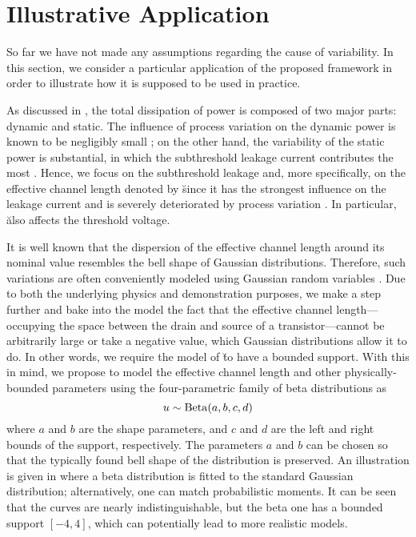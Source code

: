 \section{Illustrative Application}

So far we have not made any assumptions regarding the cause of variability. In
this section, we consider a particular application of the proposed framework in
order to illustrate how it is supposed to be used in practice.

As discussed in , the total dissipation of power is composed
of two major parts: dynamic and static. The influence of process variation on
the dynamic power is known to be negligibly small \cite{srivastava2010}; on the
other hand, the variability of the static power is substantial, in which the
subthreshold leakage current contributes the most \cite{juan2011, juan2012}.
Hence, we focus on the subthreshold leakage and, more specifically, on the
effective channel length denoted by \u since it has the strongest influence on
the leakage current and is severely deteriorated by process variation
\cite{chandrakasan2000}. In particular, \u also affects the threshold voltage.

It is well known that the dispersion of the effective channel length around its
nominal value resembles the bell shape of Gaussian distributions. Therefore,
such variations are often conveniently modeled using Gaussian random variables
\cite{bhardwaj2006, ghanta2006, huang2009a, shen2009, chandra2010,
srivastava2010, juan2011, juan2012, lee2013}. Due to both the underlying physics
and demonstration purposes, we make a step further and bake into the model the
fact that the effective channel length---occupying the space between the drain
and source of a transistor---cannot be arbitrarily large or take a negative
value, which Gaussian distributions allow it to do. In other words, we require
the model of \u to have a bounded support. With this in mind, we propose to
model the effective channel length and other physically-bounded parameters using
the four-parametric family of beta distributions as
\[
  u \sim \mathrm{Beta}(a, b, c, d)
\]
where $a$ and $b$ are the shape parameters, and $c$ and $d$ are the left and
right bounds of the support, respectively. The parameters $a$ and $b$ can be
chosen so that the typically found bell shape of the distribution is preserved.
An illustration is given in  where a beta distribution is
fitted to the standard Gaussian distribution; alternatively, one can match
probabilistic moments. It can be seen that the curves are nearly
indistinguishable, but the beta one has a bounded support $[-4, 4]$, which can
potentially lead to more realistic models.

